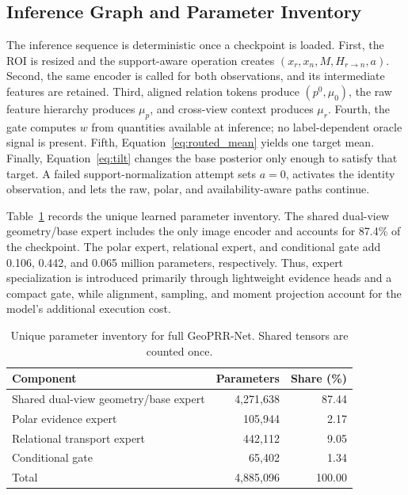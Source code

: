 \documentclass[electronics,article,submit,oneauthor]{Definitions/mdpi}
\newcommand{\modelname}{GeoPRR-Net\xspace}
\begin{document}
\subsection{Inference Graph and Parameter Inventory}
\label{subsec:inventory}

The inference sequence is deterministic once a checkpoint is loaded. First, the ROI is resized and the support-aware operation creates $(x_r,x_n,M,H_{r\rightarrow n},a)$. Second, the same encoder is called for both observations, and its intermediate features are retained. Third, aligned relation tokens produce $(p^0,\mu_0)$, the raw feature hierarchy produces $\mu_p$, and cross-view context produces $\mu_r$. Fourth, the gate computes $w$ from quantities available at inference; no label-dependent oracle signal is present. Fifth, Equation~\eqref{eq:routed_mean} yields one target mean. Finally, Equation~\eqref{eq:tilt} changes the base posterior only enough to satisfy that target. A failed support-normalization attempt sets $a=0$, activates the identity observation, and lets the raw, polar, and availability-aware paths continue.

Table~\ref{tab:parameters} records the unique learned parameter inventory. The shared dual-view geometry/base expert includes the only image encoder and accounts for 87.4\% of the checkpoint. The polar expert, relational expert, and conditional gate add 0.106, 0.442, and 0.065 million parameters, respectively. Thus, expert specialization is introduced primarily through lightweight evidence heads and a compact gate, while alignment, sampling, and moment projection account for the model's additional execution cost.

\begin{table}[H]
\caption{Unique parameter inventory for full \modelname. Shared tensors are counted once.}
\label{tab:parameters}
\centering
\small
\begin{tabularx}{0.78\textwidth}{@{}>{\raggedright\arraybackslash}Xrr@{}}
\toprule
\textbf{Component} & \textbf{Parameters} & \textbf{Share (\%)} \\
\midrule
Shared dual-view geometry/base expert & 4,271,638 & 87.44 \\
Polar evidence expert & 105,944 & 2.17 \\
Relational transport expert & 442,112 & 9.05 \\
Conditional gate & 65,402 & 1.34 \\
\midrule
Total & 4,885,096 & 100.00 \\
\bottomrule
\end{tabularx}
\end{table}
\end{document}
